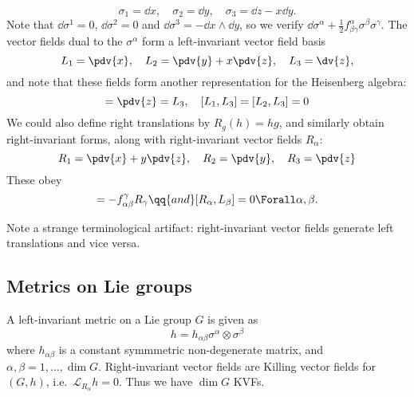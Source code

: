 \documentclass{jknotes}
\begin{document}
\begin{eg}
\begin{equation}
        \sigma_1 = \dd{x},\quad \sigma_2 = \dd{y},\quad \sigma_3 = \dd{z}-x\dd{y}.
    \end{equation}
    Note that \(\dd{\sigma^1} = 0\), \(\dd{\sigma^2} = 0\) and \(\dd{\sigma^3} = -\dd{x}\wedge\dd{y}\), so we verify \(\dd{\sigma^\alpha} + \frac{1}{2}f_{\beta\gamma}^\alpha \sigma^\beta\sigma^\gamma\). The vector fields dual to the \(\sigma^\alpha\) form a left-invariant vector field basis
    \begin{equation}
        L_1 = \pdv{x},\quad L_2=\pdv{y}+x\pdv{z},\quad L_3 = \dv{z},
    \end{equation}
    and note that these fields form another representation for the Heisenberg algebra:
    \begin{equation}
        [L_1,L_2] = \pdv{z}=L_3,\quad [L_1,L_3] = [L_2,L_3] = 0
    \end{equation}
    We could also define right translations by \(R_g(h) = hg\), and similarly obtain right-invariant forms, along with right-invariant vector fields \(R_\alpha\):
    \begin{equation}
        R_1 = \pdv{x} + y\pdv{z},\quad R_2 = \pdv{y},\quad R_3 = \pdv{z}
    \end{equation}
    These obey
    \begin{equation}
        [R_\alpha,R_\beta] = -f_{\alpha\beta}^\gamma R_\gamma \qq{and} [R_\alpha,L_\beta] = 0 \Forall \alpha,\beta.
    \end{equation}
\end{eg}

Note a strange terminological artifact: right-invariant vector fields generate left translations and vice versa.

\subsection{Metrics on Lie groups}
A left-invariant metric on a Lie group \(G\) is given as
\begin{equation}
    h = h_{\alpha\beta}\sigma^\alpha\otimes\sigma^\beta
\end{equation}
where \(h_{\alpha\beta}\) is a constant symmmetric non-degenerate matrix, and \(\alpha,\beta=1,\dots,\dim G\). Right-invariant vector fields are Killing vector fields for \((G,h)\), i.e.\ \(\mathcal{L}_{R_\alpha}h=0\). Thus we have \(\dim G\) KVFs.
\end{document}
